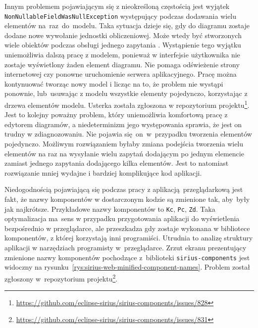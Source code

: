 Innym problemem pojawiającym się z nieokreśloną częstością jest wyjątek
\texttt{NonNullable\-FieldWasNullException} występujący podczas
dodawania wielu
elementów na~raz~do~modelu. Taka sytuacja dzieje się, gdy do diagramu zostaje
dodane nowe wywołanie jednostki obliczeniowej. Może wtedy być stworzonych wiele
obiektów podczas obsługi jednego zapytania \GraphQL{}. Wystąpienie tego
wyjątku uniemożliwia dalszą pracę z modelem, ponieważ w interfejsie użytkownika
nie zostaje wyświetlony żaden element diagramu. Nie pomaga odświeżenie strony
internetowej czy ponowne uruchomienie serwera aplikacyjnego. Pracę można
kontynuować tworząc nowy model i licząc na to, że problem nie wystąpi ponownie,
lub~usuwając z modelu wszystkie elementy pojedynczo, korzystając z drzewa
elementów modelu. Usterka została zgłoszona w repozytorium
projektu\footnote{
	\url{https://github.com/eclipse-sirius/sirius-components/issues/828}
}. Jest to kolejny poważny problem, który uniemożliwia komfortową pracę z
edytorem diagramów, a niedeterminizm jego występowania sprawia, że jest on
trudny w zdiagnozowaniu. Nie pojawia się~on~w~przypadku tworzenia elementów
pojedynczo. Możliwym rozwiązaniem byłaby zmiana podejścia tworzenia wielu
elementów na raz na wysyłanie wielu zapytań \GraphQL{} dodającym po jednym
elemencie zamiast jednego zapytania dodającego kilka elementów. Jest to
natomiast rozwiązanie mniej wydajne i bardziej komplikujące kod aplikacji.

Niedogodnością pojawiającą się podczas pracy z aplikacją przeglądarkową
\SiriusWeb{} jest fakt, że nazwy komponentów w dostarczonym kodzie
\JavaScript{} są zmienione tak, aby~były jak najkrótsze. Przykładowe nazwy
komponentów to \texttt{Kc}, \texttt{Pc}, \texttt{Zd}. Taka optymalizacja
ma~sens w przypadku przygotowania aplikacji do wyświetlenia bezpośrednio w
przeglądarce, ale przeszkadza gdy zostaje wykonana w bibliotece komponentów, z
której korzystają inni programiści. Utrudnia to analizę
struktury aplikacji w
narzędziach programisty w~przeglądarce. Zrzut ekranu prezentujący zmienione
nazwy komponentów pochodzące z~biblioteki \texttt{sirius-components} jest
widoczny na rysunku~\ref{rys:sirius-web-minified-component-names}. Problem
został zgłoszony w~repozytorium
projektu\footnote{
	\url{https://github.com/eclipse-sirius/sirius-components/issues/831}
}.


